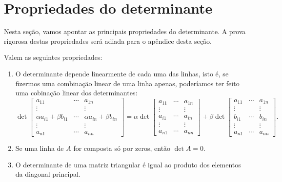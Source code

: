 \construirExer

\section{Propriedades do determinante}

Nesta seção, vamos apontar as principais propriedades do determinante. A prova rigorosa destas propriedades será adiada para o apêndice desta seção.

\begin{teo}\label{thm:prop-det}
Valem as seguintes propriedades:
\begin{enumerate}[$(i)$]
\item O determinante depende linearmente de cada uma das linhas, isto é, se fizermos uma combinação linear de uma linha apenas, poderíamos ter feito uma cobinação linear dos determinantes:
\begin{equation}
\det \begin{bmatrix}
a_{11} & \cdots & a_{1n} \\
\vdots &  & \vdots \\
\alpha a_{i1} + \beta b_{i1}  & \cdots & \alpha a_{in} + \beta b_{in} \\
\vdots &  & \vdots \\
a_{n1} & \cdots & a_{nn}
\end{bmatrix} =
\alpha \det \begin{bmatrix}
a_{11} & \cdots & a_{1n} \\
\vdots &  & \vdots \\
a_{i1} & \cdots & a_{in} \\
\vdots &  & \vdots \\
a_{n1} & \cdots & a_{nn}
\end{bmatrix} + \beta
\det \begin{bmatrix}
a_{11} & \cdots & a_{1n} \\
\vdots &  & \vdots \\
b_{i1} & \cdots & b_{in} \\
\vdots &  & \vdots \\
a_{n1} & \cdots & a_{nn}
\end{bmatrix}.
\end{equation}

\item Se uma linha de $A$ for composta só por zeros, então $\det A = 0$.

\item O determinante de uma matriz triangular é igual ao produto dos elementos da diagonal principal.


\end{enumerate}
\end{teo}
